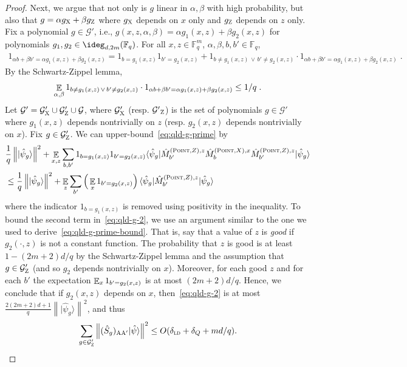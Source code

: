 \documentclass[11pt]{article}
\theoremstyle{definition}
\newcommand{\ket}[1]{|#1\rangle}
\newcommand{\bra}[1]{\langle#1|}
\newcommand{\F}{\ensuremath{\mathbb{F}}}
\newcommand{\ld}{\textsc{ld}}
\newcommand{\norm}[1]{\left\| {#1} \right\|}
\newcommand{\E}{\mathop{\mathbb{E}}\displaylimits}
\newcommand{\labelstyle}[1]{\ensuremath{\textsc{#1}}\xspace}
\newcommand{\xpt}{\labelstyle{X}}
\newcommand{\zpt}{\labelstyle{Z}}
\newcommand{\alice}{\labelstyle{A}}
\newcommand{\typestyle}[1]{\ensuremath{\textsc{#1}}\xspace}
\newcommand{\Point}{\typestyle{Point}}
\begin{document}
\begin{proof}
	Next, we argue that not only is $g$ linear in $\alpha, \beta$
        with high probability, but also that $g = \alpha g_\xpt +
        \beta g_\zpt$ where $g_\xpt$ depends on $x$ only and $g_\zpt$
        depends on $z$ only. Fix a polynomial $g \in \mathcal{G}'$,
        i.e., $g(x,z,\alpha,\beta) = \alpha g_1(x,z) + \beta g_2(x,z)$
        for polynomials $g_1, g_2 \in \ideg_{d,2m}(\F_q)$. For all $x,z \in \F_q^m$, $\alpha, \beta, b,b' \in \F_q$,
	\begin{align*}
		1_{\alpha b + \beta b' = \alpha g_1(x,z) + \beta g_2(x,z)}
		= 1_{b = g_1(x,z)} 1_{b' = g_2(x,z)} + 1_{b \neq g_1(x,z) \, \vee \, b' \neq g_2(x,z)} \cdot 1_{\alpha b + \beta b' = \alpha g_1(x,z) + \beta g_2(x,z)}\;.
	\end{align*}
	By the Schwartz-Zippel lemma,  
	\begin{equation}
	\label{eq:qld-g-separable}
	\E_{\alpha, \beta} 1_{b \neq g_1(x,z) \, \vee \, b' \neq g_2(x,z)} \cdot 1_{\alpha b + \beta b' = \alpha g_1(x,z) + \beta g_2(x,z)} \leq 1/q\;.
	\end{equation}
	Let $\mathcal{G}' = \mathcal{G}'_\xpt \cup \mathcal{G}'_\zpt \cup \mathcal{G}$, where $\mathcal{G}'_\xpt$ (resp. $\mathcal{G'}_\zpt$) is the set of polynomials $g \in \mathcal{G}'$ where $g_1(x,z)$ depends nontrivially on $z$ (resp. $g_2(x,z)$ depends nontrivially on $x$). Fix $g \in \mathcal{G}'_\zpt$. We can upper-bound~\eqref{eq:qld-g-prime} by
	\begin{align}
		&\frac{1}{q} \norm{ \ket{\hat{\psi}_g}}^2 + \E_{x,z} \sum_{b,b'} 1_{b = g_1(x,z)} 1_{b' = g_2(x,z)} \bra{\hat{\psi}_g}   \hat{M}^{(\Point,Z),z}_{b'} \hat{M}^{(\Point,X),x}_{b} \hat{M}^{(\Point,Z),z}_{b'}  \ket{\hat{\psi}_g} \label{eq:qld-g-48} \\
		&\leq \frac{1}{q} \norm{ \ket{\hat{\psi}_g}}^2 + \E_{z} \sum_{b'} \Big(\E_x 1_{b' = g_2(x,z)} \Big) \, \bra{\hat{\psi}_g}  \hat{M}^{(\Point,Z),z}_{b'}  \ket{\hat{\psi}_g}
		\label{eq:qld-g-2}
\end{align}
	where the indicator $1_{b = g_1(x,z)}$ is removed using
        positivity in the inequality. To bound the second term
      in~\eqref{eq:qld-g-2}, we use an argument similar to the one we used to
      derive~\eqref{eq:qld-g-prime-bound}. That is, say that a value
      of $z$ is \emph{good} if $g_2(\cdot ,z)$ is not a constant
      function. The probability that $z$ is good is at least $1 -
      (2m+2)d/q$ by the Schwartz-Zippel lemma and the assumption that $g \in \mathcal{G}'_{\zpt}$ (and so $g_2$ depends nontrivially on $x$). Moreover, for each good $z$ and
      for each $b'$ the expectation $\E_x 1_{b' = g_2(x,z)}$ is at
      most $(2m+2)d/q$. Hence, we conclude that if $g_2(x,z)$ depends on $x$, then~\eqref{eq:qld-g-2} is at most $ \frac{2(2m+2)d + 1}{q} \norm {\ket{\hat{\psi}_g}}^2$, and thus 
	\begin{equation}
	\label{eq:qld-g-prime-xpt-bound}
		\sum_{g \in \mathcal{G}'_\zpt} \norm{ (\hat{S}_g)_{\alice \alice'} \ket{\hat{\psi}}}^2 \leq O(\delta_\ld + \delta_Q + md/q).
	\end{equation}	
	

\end{proof}
\end{document}

